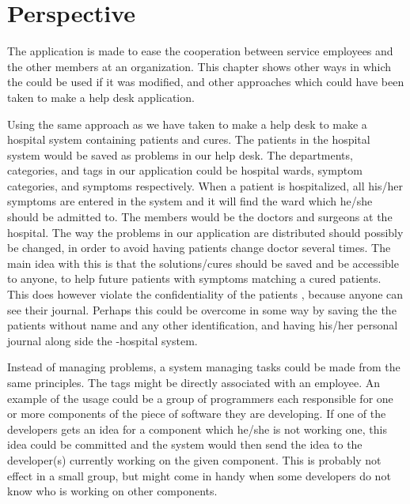 \chapter{Perspective}
\label{chap:perspective}
The \hdesk[] application is made to ease the cooperation between service employees and the other members at an organization.
This chapter shows other ways in which the \hdesk[] could be used if it was modified, and other approaches which could have been taken to make a help desk application.

Using the same approach as we have taken to make a help desk to make a hospital system containing patients and cures.
The patients in the hospital system would be saved as problems in our help desk.
The departments, categories, and tags in our application could be hospital wards, symptom categories, and symptoms respectively.
When a patient is hospitalized, all his/her symptoms are entered in the system and it will find the ward which he/she should be admitted to.
The \astaff[] members would be the doctors and surgeons at the hospital.
The way the problems in our application are distributed should possibly be changed, in order to avoid having patients change doctor several times.
The main idea with this is that the solutions/cures should be saved and be accessible to anyone, to help future patients with symptoms matching a cured patients.
This does however violate the confidentiality of the patients \cite{ama}, because anyone can see their journal.
Perhaps this could be overcome in some way by saving the the patients without name and any other identification, and having his/her personal journal along side the \hdesk[]-hospital system.

Instead of managing problems, a system managing tasks could be made from the same principles.
The tags might be directly associated with an employee.
An example of the usage could be a group of programmers each responsible for one or more components of the piece of software they are developing.
If one of the developers gets an idea for a component which he/she is not working one, this idea could be committed and the system would then send the idea to the developer(s) currently working on the given component.
This is probably not effect in a small group, but might come in handy when some developers do not know who is working on other components.

